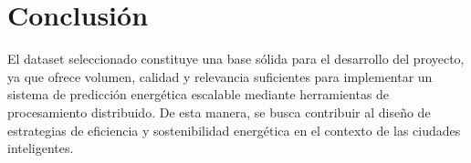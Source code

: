 \documentclass[12pt,a4paper]{article}
\begin{document}
\section*{Conclusión}
El dataset seleccionado constituye una base sólida para el desarrollo del proyecto, ya que ofrece volumen, calidad y relevancia suficientes para implementar un sistema de predicción energética escalable mediante herramientas de procesamiento distribuido.  
De esta manera, se busca contribuir al diseño de estrategias de eficiencia y sostenibilidad energética en el contexto de las ciudades inteligentes.
\end{document}
